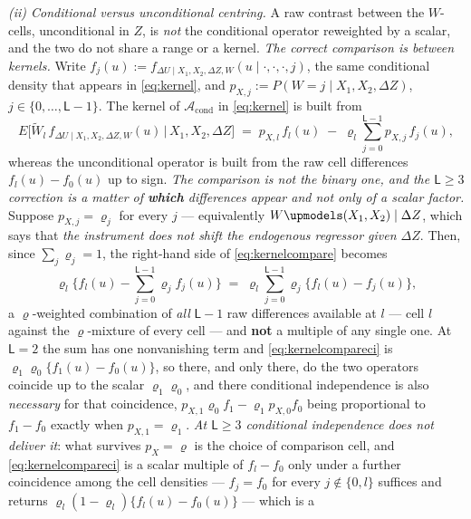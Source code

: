\begin{remark}
\emph{(ii) Conditional versus unconditional centring.} A raw contrast between the $W$-cells,
unconditional in $Z$, is \emph{not} the conditional operator reweighted by a scalar, and the two do not
share a range or a kernel. \emph{The correct comparison is
between kernels.} Write
$f_j(u):=f_{\Delta U\mid X_1,X_2,\Delta Z,W}(u\mid\cdot,\cdot,\cdot,j)$, the same conditional density
that appears in \eqref{eq:kernel}, and $p_{X,j}:=P(W=j\mid X_1,X_2,\Delta Z)$,
$j\in\{0,\dots,\mathsf L-1\}$. The kernel of
$\mathcal A_{\mathrm{cond}}$ in \eqref{eq:kernel} is built from
\begin{equation}\label{eq:kernelcompare}
E\big[\widetilde W_l\,f_{\Delta U\mid X_1,X_2,\Delta Z,W}(u)\,\big|\,X_1,X_2,\Delta Z\big]
\;=\;p_{X,l}\,f_l(u)\;-\;\varrho_l\sum_{j=0}^{\mathsf L-1}p_{X,j}\,f_j(u),
\end{equation}
whereas the unconditional operator is built from the raw cell differences $f_l(u)-f_0(u)$ up to sign.
\emph{The comparison is not the binary one, and the $\mathsf L\ge3$ correction is a matter of
\textbf{which} differences appear and not only of a scalar factor.} Suppose $p_{X,j}=\varrho_j$ for
every $j$ --- equivalently $W\upmodels(X_1,X_2)\mid\Delta Z$, which says that \emph{the instrument does
not shift the endogenous regressor given $\Delta Z$}. Then, since $\sum_j\varrho_j=1$, the right-hand
side of \eqref{eq:kernelcompare} becomes
\begin{equation}\label{eq:kernelcompareci}
\varrho_l\Big\{f_l(u)-\sum_{j=0}^{\mathsf L-1}\varrho_jf_j(u)\Big\}
\;=\;\varrho_l\sum_{j=0}^{\mathsf L-1}\varrho_j\big\{f_l(u)-f_j(u)\big\} ,
\end{equation}
a $\varrho$-weighted combination of \emph{all} $\mathsf L-1$ raw differences available at $l$ --- cell
$l$ against the $\varrho$-mixture of every cell --- and \textbf{not} a multiple of any single one.
At $\mathsf L=2$ the sum has one nonvanishing term and \eqref{eq:kernelcompareci} is
$\varrho_1\varrho_0\{f_1(u)-f_0(u)\}$, so there, and only there, do the two operators coincide up to the
scalar $\varrho_1\varrho_0$, and there conditional independence is also \emph{necessary} for that
coincidence, $p_{X,1}\varrho_0f_1-\varrho_1p_{X,0}f_0$ being proportional to $f_1-f_0$ exactly when
$p_{X,1}=\varrho_1$. \emph{At $\mathsf L\ge3$ conditional independence does not deliver it}: what
survives $p_X=\varrho$ is the choice of comparison cell, and \eqref{eq:kernelcompareci} is a scalar
multiple of $f_l-f_0$ only under a further coincidence among the cell densities --- $f_j=f_0$ for every
$j\notin\{0,l\}$ suffices and returns $\varrho_l(1-\varrho_l)\{f_l(u)-f_0(u)\}$ --- which is a

\end{remark}
